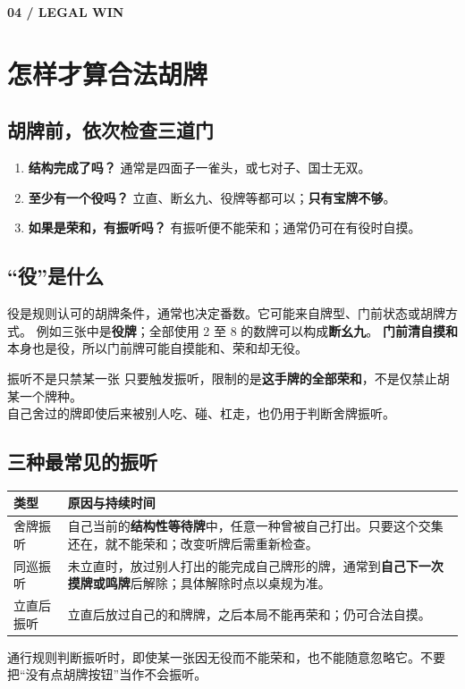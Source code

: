 \documentclass[UTF8,a4paper,zihao=5,fontset=fandol]{ctexart}
\newcommand{\pageintro}[3]{\clearpage\phantomsection\label{#1}
 {\small\sffamily\bfseries\color{gold}#2}\par\vspace{2pt}\section{#3}}
\newcommand{\smalltext}[1]{{\small\color{muted}#1}}
\newcommand{\key}[1]{\textbf{\color{teal}#1}}
\begin{document}
\pageintro{legal}{04 / LEGAL WIN}{怎样才算合法胡牌}
\subsection{胡牌前，依次检查三道门}
\begin{enumerate}
\item \textbf{结构完成了吗？} 通常是四面子一雀头，或七对子、国士无双。
\item \textbf{至少有一个役吗？} 立直、断幺九、役牌等都可以；\key{只有宝牌不够}。
\item \textbf{如果是荣和，有振听吗？} 有振听便不能荣和；通常仍可在有役时自摸。
\end{enumerate}
\subsection{“役”是什么}
役是规则认可的胡牌条件，通常也决定番数。它可能来自牌型、门前状态或胡牌方式。
例如三张中是\textbf{役牌}；全部使用 2 至 8 的数牌可以构成\textbf{断幺九}。
\textbf{门前清自摸和}本身也是役，所以门前牌可能自摸能和、荣和却无役。

\begin{alert}{振听不是只禁某一张}
只要触发振听，限制的是\textbf{这手牌的全部荣和}，不是仅禁止胡某一个牌种。\\
自己舍过的牌即使后来被别人吃、碰、杠走，也仍用于判断舍牌振听。
\end{alert}

\subsection{三种最常见的振听}
\par\noindent\begin{tabularx}{\linewidth}{L{22mm}Y}
\toprule
类型 & 原因与持续时间\\
\midrule
舍牌振听 & 自己当前的\textbf{结构性等待牌}中，任意一种曾被自己打出。只要这个交集还在，就不能荣和；改变听牌后需重新检查。\\
同巡振听 & 未立直时，放过别人打出的能完成自己牌形的牌，通常到\textbf{自己下一次摸牌或鸣牌}后解除；具体解除时点以桌规为准。\\
立直后振听 & 立直后放过自己的和牌牌，之后本局不能再荣和；仍可合法自摸。\\
\bottomrule
\end{tabularx}\par\vspace{3pt}
\smalltext{通行规则判断振听时，即使某一张因无役而不能荣和，也不能随意忽略它。不要把“没有点胡牌按钮”当作不会振听。}
\end{document}
